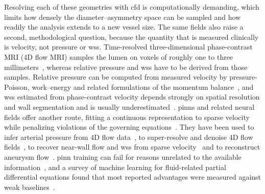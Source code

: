 \documentclass[12pt,a4paper]{article}
\newcommand{\CFD}{\ac{cfd}\xspace}
\newcommand{\PINN}{\ac{pinn}\xspace}
\newcommand{\PINNs}{\acp{pinn}\xspace}
\newcommand{\WSS}{\ac{wss}\xspace}
\theoremstyle{definition}
\numberwithin{equation}{section}
\begin{document}
Resolving each of these geometries with \CFD is computationally demanding, which limits how densely the diameter--asymmetry space can be sampled and how readily the analysis extends to a new vessel size. The same fields also raise a second, methodological question, because the quantity that is measured clinically is velocity, not pressure or \WSS. Time-resolved three-dimensional phase-contrast MRI (4D flow MRI) samples the lumen on voxels of roughly one to three millimeters~\cite{markl2012fourd}, whereas relative pressure and \WSS have to be derived from those samples. Relative pressure can be computed from measured velocity by pressure-Poisson, work--energy and related formulations of the momentum balance~\cite{krittian2012finite, bertoglio2018relative}, and \WSS estimated from phase-contrast velocity depends strongly on spatial resolution and wall segmentation and is usually underestimated~\cite{stalder2008quantitative, petersson2012assessment, potters2015volumetric}. \PINNs and related neural fields offer another route, fitting a continuous representation to sparse velocity while penalizing violations of the governing equations~\cite{raissi2019pinn, raissi2020hfm}. They have been used to infer arterial pressure from 4D flow data~\cite{kissas2020machine}, to super-resolve and denoise 4D flow fields~\cite{fathi2020super, saitta2024implicit}, to recover near-wall flow and \WSS from sparse velocity~\cite{arzani2021nearwall} and to reconstruct aneurysm flow~\cite{cruzgonzalez2025aaa}. \PINN training can fail for reasons unrelated to the available information~\cite{krishnapriyan2021failure, wang2021gradient}, and a survey of machine learning for fluid-related partial differential equations found that most reported advantages were measured against weak baselines~\cite{mcgreivy2024weak}.
\end{document}
